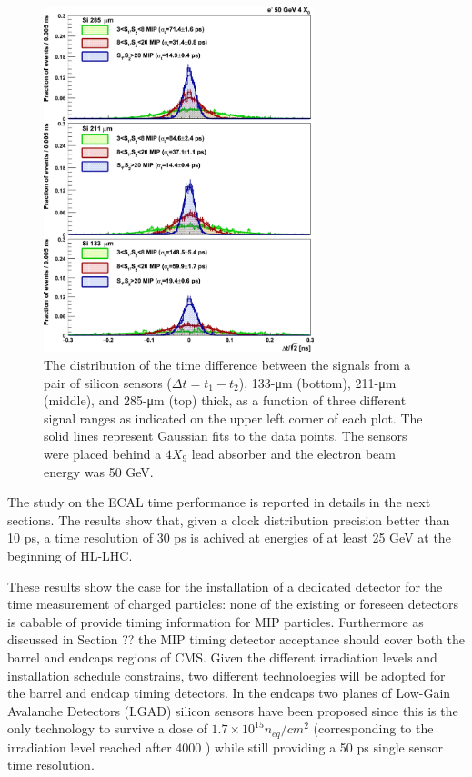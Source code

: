 \begin{figure}[h!]
  \centering
  \includegraphics[width = 0.7\textwidth]{figures/upgrade/hgcal_timing.png}
  \caption{The distribution of the time difference between the signals from a pair of silicon sensors ($\Delta t = t_1 - t_2$),
    133-μm (bottom), 211-μm (middle), and 285-μm (top) thick,
    as a function of three different signal ranges as indicated on the upper left corner of each plot.
    The solid lines represent Gaussian fits to the data points.
    The sensors were placed behind a $4X_9$ lead absorber and the electron beam energy was 50 GeV.~\cite{hgcal_tb_time}}
  \label{fig:hgcal_time_res}
\end{figure}
  
The study on the ECAL time performance is reported in details in the next sections. The results show that,
given a clock distribution precision better than 10 ps, a time resolution of 30 ps is achived at energies
of at least 25 GeV at the beginning of HL-LHC.

These results show the case for the installation of a dedicated detector for the time measurement of charged particles:
none of the existing or foreseen detectors is cabable of provide timing information for MIP particles.
Furthermore as discussed in Section ?? the MIP timing detector acceptance should cover both the barrel and endcaps
regions of CMS. Given the different irradiation levels and installation schedule constrains, two different
technoloegies will be adopted for the barrel and endcap timing detectors. In the endcaps two planes of
Low-Gain Avalanche Detectors (LGAD) silicon sensors have been proposed since this is the only technology
to survive a dose of $1.7\times 10^{15} n_{eq}/cm^2$ 
(corresponding to the irradiation level reached after 4000 \fbinv)
while still providing a 50 ps single sensor time resolution.

